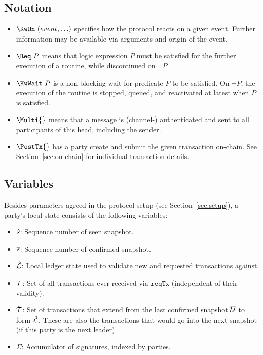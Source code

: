 \subsection{Notation}
\begin{itemize}
  \item $\KwOn~(event,\ldots)$ specifies how the protocol reacts on a given
        event. Further information may be available via arguments and origin of
        the event.
  \item $\Req~P$ means that logic expression $P$ must be satisfied for the
        further execution of a routine, while discontinued on $\neg P$.
  \item $\KwWait~P$ is a  non-blocking wait for
        predicate $P$ to be satisfied. On $\neg P$, the execution of the routine
        is stopped, queued, and reactivated at latest when $P$ is satisfied.
  \item $\Multi{}$ means that a message is (channel-) authenticated and sent to
        all participants of this head, including the sender.
  \item $\PostTx{}$ has a party create and submit the given transaction
        on-chain. See Section~\ref{sec:on-chain} for individual transaction
        details.
\end{itemize}

\subsection{Variables}

Besides parameters agreed in the protocol setup (see Section~\ref{sec:setup}), a
party's local state consists of the following variables:

\begin{itemize}
  \item $\hat s$: Sequence number of seen snapshot.
  \item $\overline s$: Sequence number of confirmed snapshot.
  \item $\hat {\mathcal L}$: Local ledger state used to validate new and requested
        transactions against.
  \item ${\mathcal T}$: Set of all transactions ever received via $\mathtt{reqTx}$
        (independent of their validity).
  \item $\hat {\mathcal T}$: Set of transactions that extend from the last confirmed
        snapshot $\overline {\mathcal U}$ to form $\hat {\mathcal L}$. These are also the transactions that
        would go into the next snapshot (if this party is the next leader).
  \item $\Sigma$: Accumulator of signatures, indexed by parties.
\end{itemize}

